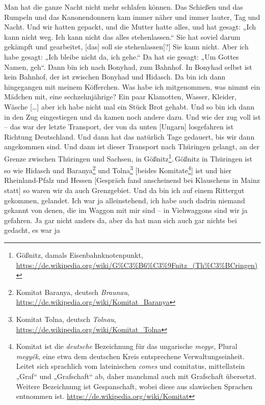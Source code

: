 \documentclass[ngerman,]{article}
\providecommand{\tightlist}{%
  \setlength{\itemsep}{0pt}\setlength{\parskip}{0pt}}
\begin{document}
\begin{multicols}{3}
\begin{description}
\tightlist
\item[Käthe]
Man hat die ganze Nacht nicht mehr schlafen können. Das Schießen und das
Rumpeln und das Kanonendonnern kam immer näher und immer lauter, Tag und
Nacht. Und wir hatten gepackt, und die Mutter hatte alles, und hat
gesagt: „Ich kann nicht weg. Ich kann nicht das alles stehenlassen.“ Sie
hat soviel darum gekämpft und gearbeitet, {[}das{]} soll sie
stehenlassen{[}?{]} Sie kann nicht. Aber ich habe gesagt: „Ich bleibe
nicht da, ich gehe.“ Da hat sie gesagt: „Um Gottes Namen, geh“. Dann bin
ich nach Bonyhad, zum Bahnhof. In Bonyhad selbst ist kein Bahnhof, der
ist zwischen Bonyhad und Hidasch. Da bin ich dann hingegangen mit meinem
Köfferchen. Was habe ich mitgenommen, was nimmt ein Mädchen mit, eine
sechzehnjährige? Ein paar Klamotten, Wasser, Kleider, Wäsche
{[}\ldots{}{]} aber ich habe nicht mal ein Stück Brot gehabt. Und so bin
ich dann in den Zug eingestiegen und da kamen noch andere dazu. Und wie
der zug voll ist – das war der letzte Transport, der von da unten
{[}Ungarn{]} losgefahren ist Richtung Deutschland. Und dann hat das
natürlich Tage gedauert, bis wir dann angekommen sind. Und dann ist
dieser Transport nach Thüringen gelangt, an der Grenze zwischen
Thüringen und Sachsen, in Gößnitz\footnote{Gößnitz, damals
  Eisenbahnknotenpunkt,
  \url{https://de.wikipedia.org/wiki/G\%C3\%B6\%C3\%9Fnitz_(Th\%C3\%BCringen)}}.\,Gößnitz
in Thüringen ist so wie Hidasch und Baranya\footnote{Komitat Baranya,
  deutsch \emph{Braunau},
  \url{https://de.wikipedia.org/wiki/Komitat_Baranya}} und
Tolna\footnote{Komitat Tolna, deutsch \emph{Tolnau},
  \url{https://de.wikipedia.org/wiki/Komitat_Tolna}} {[}beides
Komitate\footnote{Komitat ist die \emph{deutsche} Bezeichnung für das
  ungarische \emph{megye}, Plural \emph{megyék}, eine etwa dem deutschen
  Kreis entsprechene Verwaltungseinheit. Leitet sich sprachlich vom
  lateinischen \emph{comes} und comitatus, mittellatein „Graf“ und
  „Grafschaft“ ab, daher manchmal auch mit Grafschaft übersetzt. Weitere
  Bezeichnung ist Gespanschaft, wobei diese aus slawischen Sprachen
  entnommen ist. \url{https://de.wikipedia.org/wiki/Komitat}}{]} ist und
hier Rheinland-Pfalz und Hessen {[}Gespräch fand anscheinend bei
Klauschens in Mainz statt{]} so waren wir da auch Grenzgebiet. Und da
bin ich auf einem Rittergut gekommen, gelandet. Ich war ja
alleinstehend, ich habe auch dadrin niemand gekannt von denen, die im
Waggon mit mir sind – in Viehwaggons sind wir ja gefahren. Ja gar nicht
anders da, aber da hat man sich auch gar nichts bei gedacht, es war ja

\end{description}
\end{multicols}
\end{document}
